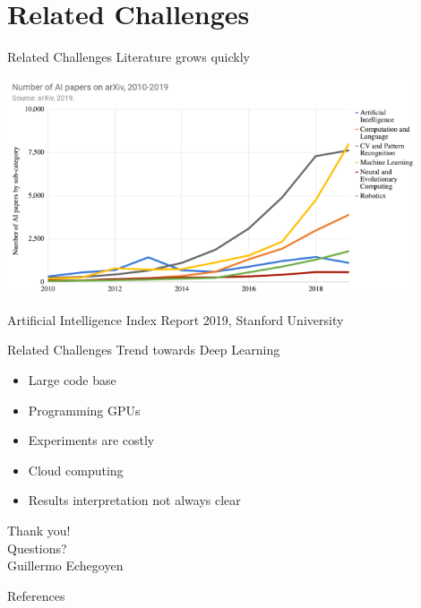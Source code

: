 \documentclass{beamer}
\begin{document}
\section{Related Challenges}
\begin{frame}{Related Challenges}
  \alert{\Large Literature grows quickly}
  \begin{center}
    \includegraphics[width=0.9\textwidth]{./figures/ai_papers_arxiv_alpha.png}
  \end{center}
  \begin{flushright}
    {\tiny Artificial Intelligence Index Report 2019, Stanford University}
  \end{flushright}
\end{frame}

\begin{frame}{Related Challenges}
  \alert{\Large Trend towards Deep Learning}
  \begin{itemize}
    \item Large code base
    \item Programming GPUs
    \item Experiments are costly
    \item Cloud computing
    \item Results interpretation not always clear
  \end{itemize}
\end{frame}


\begin{frame}
  \begin{center}
    \Huge Thank you! \\
    \huge Questions? \\
    \Large Guillermo Echegoyen
  \end{center}
\end{frame}

\begin{frame}[allowframebreaks]{References}
  
  
\end{frame}
\end{document}
